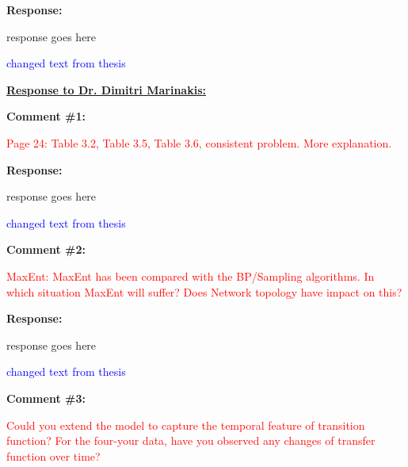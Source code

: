 \documentclass[journal]{IEEEtran}
\begin{document}
\vspace{10pt}
\textbf{Response:}
\begin{adjustwidth}{2.5em}{0pt}
response goes here

\vspace{10pt}
\noindent\textcolor{blue}{changed text from thesis}
\end{adjustwidth}







\vspace{50pt} 
  \Large
\noindent \textbf{\underline{Response to Dr. Dimitri Marinakis:}}
 \large
 
\vspace{10pt}
\textbf{Comment \#1:}
\begin{adjustwidth}{2.5em}{0pt}
\singlespacing \vspace{-10pt}
\textcolor{red}{Page 24: Table 3.2, Table 3.5, Table 3.6, consistent problem. More explanation.}
\end{adjustwidth}

\vspace{10pt}
\textbf{Response:}
\begin{adjustwidth}{2.5em}{0pt}
response goes here

\vspace{10pt}
\noindent\textcolor{blue}{changed text from thesis}
\end{adjustwidth}


\vspace{30pt}
\textbf{Comment \#2:}
\begin{adjustwidth}{2.5em}{0pt}
\singlespacing \vspace{-10pt}
\textcolor{red}{MaxEnt: MaxEnt has been compared with the BP/Sampling algorithms. In which situation MaxEnt will suffer? Does Network topology have impact on this?}
\end{adjustwidth}

\vspace{10pt}
\textbf{Response:}
\begin{adjustwidth}{2.5em}{0pt}
response goes here

\vspace{10pt}
\noindent\textcolor{blue}{changed text from thesis}
\end{adjustwidth}


\vspace{30pt}
\textbf{Comment \#3:}
\begin{adjustwidth}{2.5em}{0pt}
\singlespacing \vspace{-10pt}
\textcolor{red}{Could you extend the model to capture the temporal feature of transition function? For the four-your data, have you observed any changes of transfer function over time?}
\end{adjustwidth}
\end{document}
